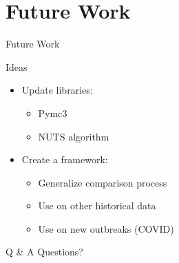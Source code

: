 \documentclass[t,10pt,fleqn]{beamer}
\begin{document}
\section{Future Work}
\begin{frame}{Future Work}
	\vspace{-.3cm}
	\begin{block}{Ideas}
		\begin{itemize}
			\pause
			\item Update libraries:
			      \pause
			      \begin{itemize}
				      \item Pymc3
				            \pause
				      \item NUTS algorithm
			      \end{itemize}
			      \pause
			\item Create a framework:
			      \begin{itemize}
				      \item Generalize comparison process
				            \pause
				      \item Use on other historical data
				      \item Use on new outbreaks (COVID)
			      \end{itemize}
		\end{itemize}
	\end{block}
\end{frame}


\begin{frame}{Q \& A}
	\centering
	Questions?
\end{frame}

\end{document}

